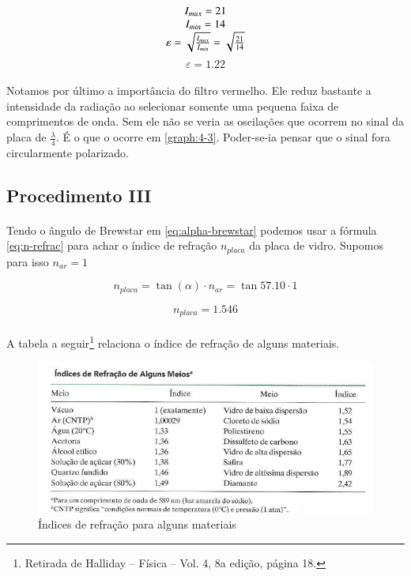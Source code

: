 \documentclass[a4paper,11pt]{article}
\begin{document}
\begin{displaymath}
	\begin{tabular}{c}
	$I_{max} = 21$ \\	
	$I_{min} = 14 $\\	
	$\varepsilon = \sqrt{\frac{I_{max}}{I_{min}}} = \sqrt{\frac{21}{14}}$ \\
\end{tabular}		
\end{displaymath}
\begin{equation}
	\varepsilon = 1.22
\end{equation}

\paragraph{}Notamos por último a importância do filtro vermelho. Ele reduz bastante a intensidade da radiação ao selecionar somente uma pequena faixa de comprimentos de onda. Sem ele não se veria as oscilações que ocorrem no sinal da placa de $\frac{\lambda}{4}$. É o que o ocorre em \ref{graph:4-3}. Poder-se-ia pensar que o sinal fora circularmente polarizado.

\subsection*{Procedimento III} 
\paragraph{}Tendo o ângulo de Brewstar em \ref{eq:alpha-brewstar} podemos usar a fórmula \ref{eq:n-refrac} para achar o índice de refração $n_{placa}$ da placa de vidro. Supomos para isso $n_{ar} = 1$

\begin{displaymath}
	n_{placa} = \tan(\alpha) \cdot n_{ar} = \tan{57.10} \cdot 1 
\end{displaymath}

\begin{equation}
	n_{placa} = 1.546
\end{equation}

\paragraph{}A tabela a seguir\footnote{Retirada de Halliday – Física – Vol. 4, 8a edição, página 18.
} relaciona o índice de refração de alguns materiais.
\FloatBarrier
\begin{figure}[!h]
\centering
	\includegraphics[scale=0.5]{indices-halliday.png}
	\caption{Índices de refração para alguns materiais}
\end{figure}
\FloatBarrier
\end{document}
